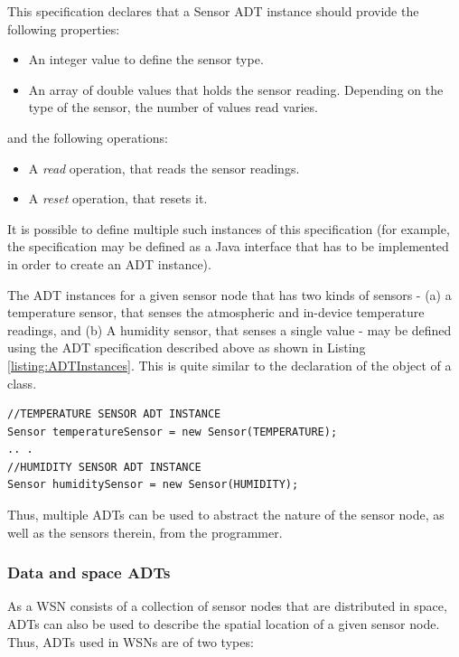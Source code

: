 This specification declares that a Sensor ADT instance should provide the
following properties:
\begin{itemize}
\item An integer value to define the sensor type.   
\item An array of double values that holds the sensor reading. Depending on the
type of the sensor, the number of values read varies.
\end{itemize}

and the following operations:
\begin{itemize}
  \item A \emph{read} operation, that reads the sensor readings.
  \item A \emph{reset} operation, that resets it.
\end{itemize}

It is possible to define multiple such instances of this specification (for
example, the specification may be defined as a Java interface that has to
be implemented in order to create an ADT instance).

The ADT instances for a given sensor node that has two kinds of
sensors - (a) a temperature sensor, that senses the atmospheric and in-device
  temperature readings, and (b) A humidity sensor, that senses a single value -
  may be defined using the ADT specification described above as shown in
  Listing \ref{listing:ADTInstances}. This is quite similar to the declaration
  of the object of a class.  
 \begin{lstlisting}[basicstyle=\ttfamily\footnotesize, basewidth={0.55em, 0.6em}, captionpos=b, frame = trbl, breaklines, caption = Sensor ADT instances, lineskip=0pt, label = listing:ADTInstance]
//TEMPERATURE SENSOR ADT INSTANCE
Sensor temperatureSensor = new Sensor(TEMPERATURE);
.. .
//HUMIDITY SENSOR ADT INSTANCE
Sensor humiditySensor = new Sensor(HUMIDITY);
\end{lstlisting}

Thus, multiple ADTs can be used to abstract the nature of the
sensor node, as well as the sensors therein, from the programmer. 

\subsubsection{Data and space ADTs} \label{subsubsec:DataAndSpaceADTs}

As a WSN consists of a collection of sensor nodes that are distributed in
space, ADTs can also be used to describe the spatial location of a given
sensor node. Thus, ADTs used in WSNs are of two types:

